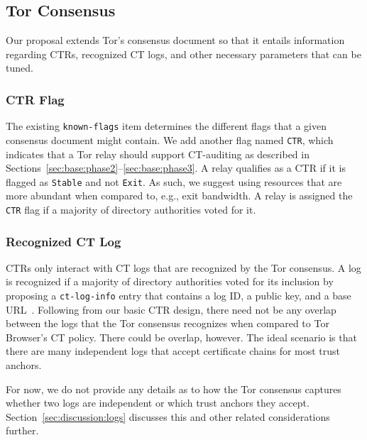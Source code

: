 \subsection{Tor Consensus} \label{sec:base:consensus}
Our proposal extends Tor's consensus document
so that it entails information regarding
	CTRs,
	recognized CT logs, and
	other necessary parameters that can be tuned.

\subsubsection{CTR Flag} \label{sec:base:consensus:ctr-flag}
The existing \texttt{known-flags} item determines the different flags that a 
given consensus document might contain.  We add another flag named \texttt{CTR},
which indicates that a Tor relay should support CT-auditing as described in
Sections~\ref{sec:base:phase2}--\ref{sec:base:phase3}.  A relay qualifies as a
CTR if it is flagged as \texttt{Stable} and not \texttt{Exit}.  As such, we
suggest using resources that are more abundant when compared to, e.g., exit
bandwidth.  A relay is assigned the \texttt{CTR} flag if a majority of directory
authorities voted for it.

\subsubsection{Recognized CT Log} \label{sec:base:consensus:log}
CTRs only interact with CT logs that are recognized by the Tor consensus.  A log
is recognized if a majority of directory authorities voted for its inclusion by
proposing a \texttt{ct-log-info} entry that contains a log ID, a public key, and
a base URL~\cite{ct,ct/bis}. 
Following from our basic CTR design, there need not be any overlap between the
logs that the Tor consensus recognizes when compared to Tor Browser's CT policy.
There could be overlap, however.  The ideal scenario is that there are many
independent logs that accept certificate chains for most trust anchors.

For now, we do not provide any details as to how the Tor consensus captures
whether two logs are independent or which trust anchors they accept.
Section~\ref{sec:discussion:logs} discusses this and other related
considerations further.

